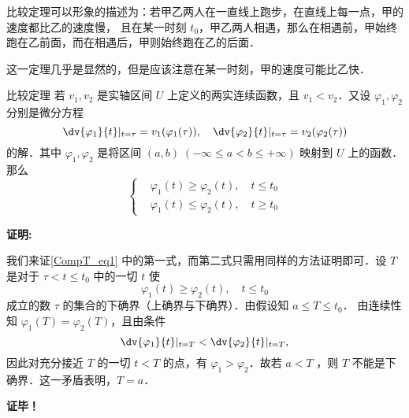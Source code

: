 比较定理可以形象的描述为：若甲乙两人在一直线上跑步，在直线上每一点，甲的速度都比乙的速度慢， 且在某一时刻 $t_0$，甲乙两人相遇，那么在相遇前，甲始终跑在乙前面，而在相遇后，甲则始终跑在乙的后面．

这一定理几乎是显然的，但是应该注意在某一时刻，甲的速度可能比乙快．
\begin{theorem}{比较定理}
若 $v_1,v_2$ 是实轴区间 $U$ 上定义的两实连续函数，且 $v_1<v_2$．又设 $\varphi_1,\varphi_2$ 分别是微分方程
\begin{equation}
\dv{\varphi_1}{t}|_{t=\tau}=v_1(\varphi_1(\tau)), \quad \dv{\varphi_2}{t}|_{t=\tau}=v_2(\varphi_2(\tau))
\end{equation}
的解．其中 $\varphi_1,\varphi_2$ 是将区间 $(a,b)\;(-\infty\leq a<b\leq+\infty)$ 映射到 $U$ 上的函数．那么
\begin{equation}\label{CompT_eq1}
\left\{\begin{aligned}
    &\varphi_1(t)\geq\varphi_2(t),\quad t\leq t_0\\
    &\varphi_1(t)\leq\varphi_2(t),\quad t\geq t_0
\end{aligned}\right.
\end{equation}

\end{theorem} 
\textbf{证明:}

我们来证\autoref{CompT_eq1} 中的第一式，而第二式只需用同样的方法证明即可．设 $T$ 是对于 $\tau<t\leq t_0$ 中的一切 $t$ 使
\begin{equation}
\varphi_1(t)\geq\varphi_2(t),\quad t\leq t_0
\end{equation}
成立的数 $\tau$ 的集合的下确界（上确界与下确界）．由假设知 $a\leq T\leq t_0$．
由连续性知 $\varphi_1(T)=\varphi_2(T)$，且由条件
\begin{equation}
\dv{\varphi_1}{t}|_{t=T}<\dv{\varphi_2}{t}|_{t=T},
\end{equation}
因此对充分接近 $T$ 的一切 $t<T$ 的点，有 $\varphi_1>\varphi_2$．故若 $a<T$ ，则 $T$ 不能是下确界．这一矛盾表明，$T=a$．

\textbf{证毕！}
